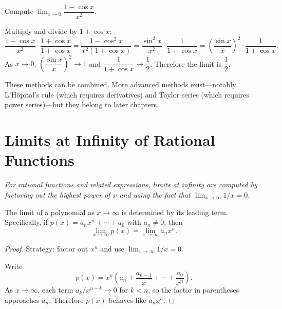 \begin{example}
\label{ex:2-17}
Compute $\displaystyle\lim_{x \to 0} \dfrac{1 - \cos x}{x^{2}}$.

Multiply and divide by $1 + \cos x$:
\[
  \dfrac{1 - \cos x}{x^{2}} \cdot \dfrac{1 + \cos x}{1 + \cos x}
  = \dfrac{1 - \cos^{2} x}{x^{2}(1 + \cos x)}
  = \dfrac{\sin^{2} x}{x^{2}} \cdot \dfrac{1}{1 + \cos x}
  = \left(\dfrac{\sin x}{x}\right)^{\!2} \cdot \dfrac{1}{1 + \cos x}.
\]
As $x \to 0$, $\left(\dfrac{\sin x}{x}\right)^{2} \to 1$ and $\dfrac{1}{1 + \cos x} \to \dfrac{1}{2}$.  Therefore the limit is $\dfrac{1}{2}$.
\end{example}

\begin{remark}
These methods can be combined.  More advanced methods exist---notably L'H\^opital's rule (which requires derivatives) and Taylor series (which requires power series)---but they belong to later chapters.
\end{remark}

\section{Limits at Infinity of Rational Functions}
\label{sec:2.20}

\textit{For rational functions and related expressions, limits at infinity are computed by factoring out the highest power of $x$ and using the fact that $\lim_{x \to \infty} 1/x = 0$.}

\begin{theorem}
\label{thm:2-14}
The limit of a polynomial as $x \to \infty$ is determined by its leading term.  Specifically, if $p(x) = a_{n}x^{n} + \cdots + a_{0}$ with $a_{n} \neq 0$, then
\[
  \lim_{x \to \infty} p(x) = \lim_{x \to \infty} a_{n}x^{n}.
\]
\end{theorem}

\begin{proof}
Strategy: factor out $x^{n}$ and use $\lim_{x \to \infty} 1/x = 0$.

Write
\[
  p(x) = x^{n}\!\left(a_{n} + \dfrac{a_{n-1}}{x} + \cdots + \dfrac{a_{0}}{x^{n}}\right).
\]
As $x \to \infty$, each term $a_{k}/x^{n-k} \to 0$ for $k < n$, so the factor in parentheses approaches $a_{n}$.  Therefore $p(x)$ behaves like $a_{n} x^{n}$.
\end{proof}

